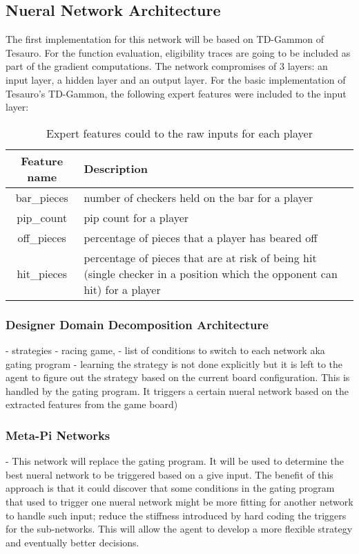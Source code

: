 \documentclass[12pt,a4paper]{article}
\begin{document}
\subsection{Nueral Network Architecture} \label{modnet}
The first implementation for this network will be based on TD-Gammon of Tesauro. 
For the function evaluation, eligibility traces are going to be included as part of the gradient computations. 
The network compromises of 3 layers: an input layer, a hidden layer and an output layer. 
For the basic implementation of Tesauro's TD-Gammon, the following expert features were included to the input layer:
\begin{table}[htb]
    \centering
    \caption{Expert features could to the raw inputs for each player}
    \vspace*{6pt}
    \label{exfeat}
    \begin{tabular}{cp{12cm}}
        \hline
        \hline
        Feature name & Description \\ 
        \hline
        bar\_pieces & number of checkers held on the bar for a player\\
        \hline
        pip\_count & pip count for a player \\
        \hline
        off\_pieces & percentage of pieces that a player has beared off \\
        \hline
        hit\_pieces & percentage of pieces that are at risk of being hit (single checker in a position which the opponent can hit) for a player \\
        \hline
    \end{tabular}
\end{table}
\subsubsection{Designer Domain Decomposition Architecture}

- strategies - racing game, 
- list of conditions to switch to each network aka gating program
- learning the strategy is not done explicitly but it is left to the agent to figure out the strategy based on the current board configuration. This is handled by the gating program. It triggers a certain nueral network based on the extracted features from the game board)

\subsubsection{Meta-Pi Networks}
- This network will replace the gating program. It will be used to determine the best nueral network to be triggered based on a give input. The benefit of this approach is that it could discover that some conditions in the gating program that used to trigger one nueral network might be more fitting for another network to handle such input; reduce the stiffness introduced by hard coding the triggers for the sub-networks. This will allow the agent to develop a more flexible strategy and eventually better decisions.
\end{document}
